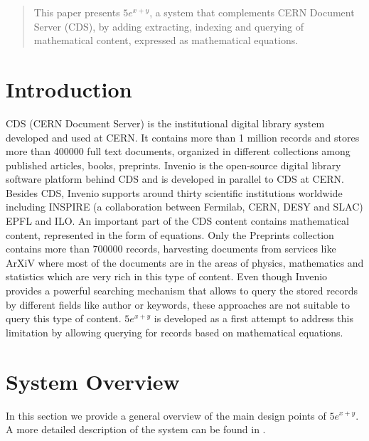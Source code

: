 \documentclass{sig-alternate}
\begin{document}
\maketitle
\begin{abstract}
This paper presents $5e^{x+y}$, a system that complements CERN Document Server (CDS), by adding extracting, indexing and querying of mathematical content, expressed as mathematical equations.
\end{abstract}




\section{Introduction}
CDS\cite{CDS1} (CERN Document Server) is the institutional digital library system
developed and used at CERN\cite{CERN}. It contains more than 1 million records and stores more than 400000 full text documents, organized in different collections among published articles, books, preprints. Invenio\cite{invenio} is the open-source digital library software platform behind CDS and is developed in parallel to CDS at CERN. Besides CDS, Invenio supports around thirty scientific institutions worldwide including INSPIRE (a collaboration between Fermilab, CERN, DESY and SLAC) EPFL and ILO. 
An important part of the CDS content contains mathematical content, represented in the form of equations. Only the Preprints collection contains more than 700000 records, harvesting documents from services like ArXiV\cite{arxiv} where most of the documents are in the areas of physics, mathematics and statistics which are very rich in this type of content. Even though Invenio provides a powerful searching mechanism that allows to query the stored records by different fields like author or keywords, these approaches are not suitable to query this type of content. $5e^{x+y}$ is developed as a first attempt to address this limitation by allowing querying for records based on mathematical equations. 

\section{System Overview}
In this section we provide a general overview of the main design points of $5e^{x+y}$. A more detailed description of the system can be found in \cite{mathexplorerweb}.
\end{document}
